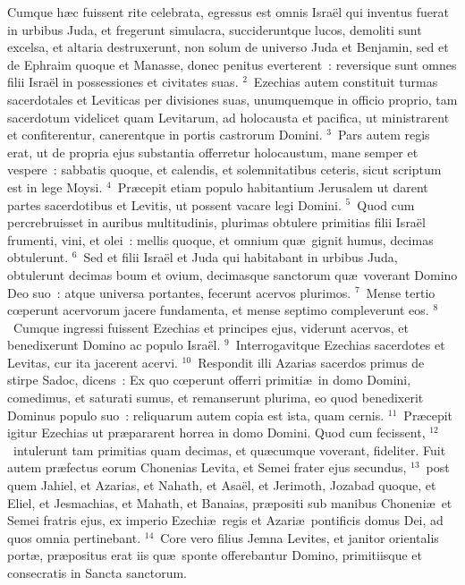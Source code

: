 \lettrine[lines=10,image=true,loversize=0.05,lraise=-0.03]{C}{}umque h\ae c fuissent rite celebrata, egressus est omnis Isra\"el qui inventus fuerat in urbibus Juda, et fregerunt simulacra, succideruntque lucos, demoliti sunt excelsa, et altaria destruxerunt, non solum de universo Juda et Benjamin, sed et de Ephraim quoque et Manasse, donec penitus everterent~: reversique sunt omnes filii Isra\"el in possessiones et civitates suas.
${}^{2}$~Ezechias autem constituit turmas sacerdotales et Leviticas per divisiones suas, unumquemque in officio proprio, tam sacerdotum videlicet quam Levitarum, ad holocausta et pacifica, ut ministrarent et confiterentur, canerentque in portis castrorum Domini.
${}^{3}$~Pars autem regis erat, ut de propria ejus substantia offerretur holocaustum, mane semper et vespere~: sabbatis quoque, et calendis, et solemnitatibus ceteris, sicut scriptum est in lege Moysi.
${}^{4}$~Pr\ae cepit etiam populo habitantium Jerusalem ut darent partes sacerdotibus et Levitis, ut possent vacare legi Domini.
${}^{5}$~Quod cum percrebruisset in auribus multitudinis, plurimas obtulere primitias filii Isra\"el frumenti, vini, et olei~: mellis quoque, et omnium qu\ae\ gignit humus, decimas obtulerunt.
${}^{6}$~Sed et filii Isra\"el et Juda qui habitabant in urbibus Juda, obtulerunt decimas boum et ovium, decimasque sanctorum qu\ae\ voverant Domino Deo suo~: atque universa portantes, fecerunt acervos plurimos.
${}^{7}$~Mense tertio cœperunt acervorum jacere fundamenta, et mense septimo compleverunt eos.
${}^{8}$~Cumque ingressi fuissent Ezechias et principes ejus, viderunt acervos, et benedixerunt Domino ac populo Isra\"el.
${}^{9}$~Interrogavitque Ezechias sacerdotes et Levitas, cur ita jacerent acervi.
${}^{10}$~Respondit illi Azarias sacerdos primus de stirpe Sadoc, dicens~: Ex quo cœperunt offerri primiti\ae\ in domo Domini, comedimus, et saturati sumus, et remanserunt plurima, eo quod benedixerit Dominus populo suo~: reliquarum autem copia est ista, quam cernis.
${}^{11}$~Pr\ae cepit igitur Ezechias ut pr\ae pararent horrea in domo Domini. Quod cum fecissent,
${}^{12}$~intulerunt tam primitias quam decimas, et qu\ae cumque voverant, fideliter. Fuit autem pr\ae fectus eorum Chonenias Levita, et Semei frater ejus secundus,
${}^{13}$~post quem Jahiel, et Azarias, et Nahath, et Asa\"el, et Jerimoth, Jozabad quoque, et Eliel, et Jesmachias, et Mahath, et Banaias, pr\ae positi sub manibus Choneni\ae\ et Semei fratris ejus, ex imperio Ezechi\ae\ regis et Azari\ae\ pontificis domus Dei, ad quos omnia pertinebant.
${}^{14}$~Core vero filius Jemna Levites, et janitor orientalis port\ae , pr\ae positus erat iis qu\ae\ sponte offerebantur Domino, primitiisque et consecratis in Sancta sanctorum.
